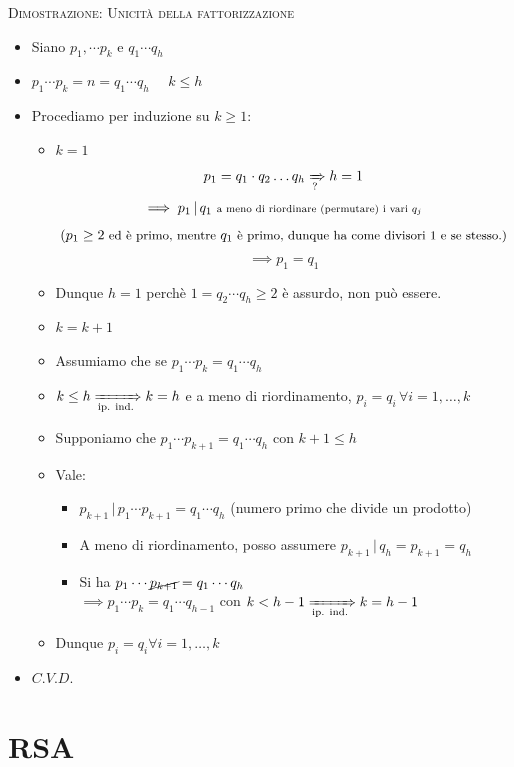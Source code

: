 \documentclass[10pt]{article}
\begin{document}
\textsc{Dimostrazione: Unicità della fattorizzazione}
\begin{itemize}
\item
Siano $p_1, \dotsb p_k$ e $q_1 \dotsb q_h$
\item
$p_1 \dotsb p_k = n = q_1 \dotsb q_h$ $\quad k \leq h$
\item
Procediamo per induzione su $k \geq 1$:
\begin{itemize}
\item
$k=1$
$$ p_1 = q_1 \cdot q_2 \dots q_h \xRightarrow[\text{?}]{} h=1$$
$$\implies p_1 \,|\, q_1 \textrm{ \scriptsize{a meno di riordinare (permutare) i vari }} \scriptstyle{q_j}$$
$$\scriptsize{\small{(p_1 \geq 2} \textrm{ ed è primo, mentre } q_1 \textrm{ è primo, dunque ha come divisori 1 e se stesso.)}} $$
$$\implies p_1 = q_1$$
\item
Dunque $h = 1$ perchè $1 = q_2 \dotsb q_h \geq 2$ è assurdo, non può essere.
\item
$k = k +1$
\item
Assumiamo che se $p_1 \dotsb p_k = q_1 \dotsb q_h$
\item
$k \leq h \xRightarrow[\text{ip. ind.}]{} k=h$ e a meno di riordinamento, $p_i = q_i \,\forall i = 1, \dots , k$
\item
Supponiamo che $p_1 \dotsb p_{k+1} = q_1 \dotsb q_h$ con $k + 1 \leq h$
\item
Vale:
\begin{itemize}
\item
$p_{k+1} \,|\, p_1 \dotsb p_{k+1} = q_1 \dotsb q_h$ \small{(numero primo che divide un prodotto)}
\item
A meno di riordinamento, posso assumere $p_{k+1} \,|\, q_h = p_{k+1} = q_h$
\item
Si ha $p_1 \dotsb \cancel{p_{k+1}} = q_1 \dotsb q_h$ \\
$\implies p_1 \dotsb p_k = q_1 \dotsb q_{h-1}$ con $k < h-1 \xRightarrow[\text{ip. ind.}]{} k = h-1$
\end{itemize}
\item
Dunque $p_i = q_i \forall i = 1,\dots,k$
\end{itemize}
\item
$C.V.D.$
\end{itemize}
\newpage
\section{RSA}
\end{document}
